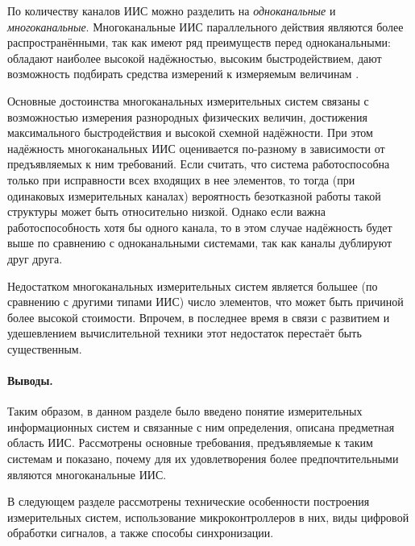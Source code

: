 \documentclass[a4paper, 14pt, titlepage]{extarticle}
\newcommand{\term}[1]{\emph{#1}}
\let\oldparagraph\paragraph
\renewcommand{\paragraph}[1]{\oldparagraph{\indent #1}}
\begin{document}
  По количеству каналов ИИС можно разделить на \term{одноканальные} и \term{многоканальные}. Многоканальные ИИС
  параллельного действия являются более распространёнными, так как имеют ряд преимуществ перед
  одноканальными: обладают наиболее высокой надёжностью, высоким быстродействием, дают возможность
  подбирать средства измерений к измеряемым величинам
  \cite[с.~171]{rannev-iis}.

  Основные достоинства многоканальных измерительных систем связаны с возможностью измерения
  разнородных физических величин, достижения
  максимального быстродействия и высокой схемной надёжности. При этом надёжность многоканальных ИИС
  оценивается по-разному в зависимости от предъявляемых к ним требований. Если считать, что система
  работоспособна только при исправности всех входящих в нее элементов, то тогда (при одинаковых
  измерительных каналах) вероятность безотказной работы такой структуры может быть относительно
  низкой. Однако если важна работоспособность хотя бы одного канала, то в этом случае надёжность
  будет выше по сравнению с одноканальными системами, так как каналы дублируют друг друга.

  Недостатком многоканальных измерительных систем является большее (по сравнению с
  другими типами ИИС) число элементов, что может быть причиной более высокой стоимости. Впрочем, в
  последнее время в связи с развитием и удешевлением вычислительной техники этот недостаток
  перестаёт быть существенным. %



  \paragraph{Выводы.} %
  Таким образом, в данном разделе было введено понятие измерительных информационных
  систем и связанные с ним определения, описана предметная область ИИС. Рассмотрены
  основные требования, предъявляемые к таким системам и показано, почему для их удовлетворения более
  предпочтительными являются многоканальные ИИС.

  В следующем разделе рассмотрены технические особенности построения измерительных систем,
  использование микроконтроллеров в них, виды цифровой обработки сигналов, а также способы
  синхронизации.
\end{document}

